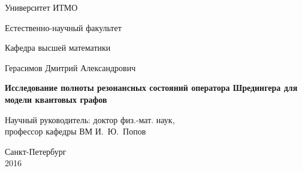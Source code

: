 \documentclass[a4paper]{report}
\theoremstyle{plain}
\theoremstyle{definition}
\numberwithin{theorem}{chapter}        %
\begin{document}
\initializefrontsections

\pagestyle{title}

\begin{center}
Университет ИТМО

\vspace{2cm}

Естественно-научный факультет

Кафедра высшей математики

\vspace{3cm}

{\Large Герасимов Дмитрий Александрович}

\vspace{2cm}

\vbox{\LARGE\bfseries
Исследование полноты резонансных состояний оператора Шредингера для модели квантовых графов
}

\vspace{4cm}

{\Large Научный руководитель: доктор физ.-мат. наук, \\ профессор кафедры ВМ И.~Ю.~Попов}

\vspace{6cm}

Санкт-Петербург\\ 2016
\end{center}

\newpage

\setcounter{page}{3}
\pagestyle{plain}

\tableofcontents

\startthechapters



% 

\printbibliography

\newpage
\listoftodos[Notes]

\startappendices

\end{document}
